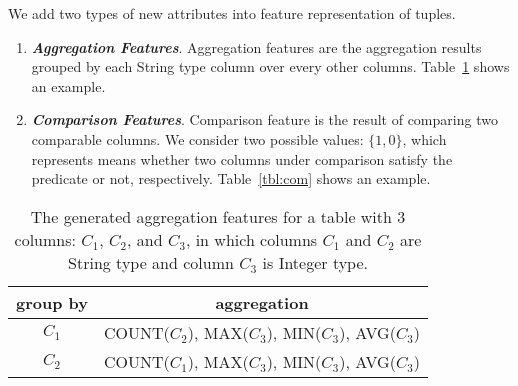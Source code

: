 We add two types of new attributes into feature representation of tuples.


\begin{enumerate}

\item \textit{\textbf{Aggregation Features}}. Aggregation
features are the aggregation results grouped by each \textsf{String} type column
over every other columns. Table~\ref{tbl:agg} shows an example.


\item \textit{\textbf{Comparison Features}}. Comparison
feature is the result of comparing two comparable columns. We
consider two possible values:  $\{1, 0\}$,  which represents
means whether two columns under comparison satisfy the predicate or not, respectively.
Table~\ref{tbl:com} shows an example.


\end{enumerate}

\begin{table}[t]
	\begin{center}
		\begin{tabular}{|c|c|}
		\hline
		\textbf{group by}	& \textbf{aggregation} \\
		\hline
		$C_1$ 				& \textsf{COUNT}($C_2$), \textsf{MAX}($C_3$), \textsf{MIN}($C_3$), \textsf{AVG}($C_3$)\\
		$C_2$ 				& \textsf{COUNT}($C_1$), \textsf{MAX}($C_3$), \textsf{MIN}($C_3$), \textsf{AVG}($C_3$)\\
		\hline
		\end{tabular}
	\end{center}
	\caption{The generated aggregation features for
a table with 3 columns:  $C_1$, $C_2$, and $C_3$, in which
columns $C_1$ and $C_2$ are \textsf{String} type and column $C_3$ is
\textsf{Integer} type.}
	\label{tbl:agg}
\end{table}



